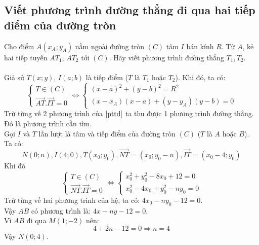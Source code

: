 \subsection{Viết phương trình đường thẳng đi qua hai tiếp điểm của đường tròn}
Cho điểm $A\left(x_A; y_A \right)$ nằm ngoài đường tròn $(C)$ tâm $I$ bán kính $R$. Từ $A$, kẻ hai tiếp tuyến $AT_1$, $AT_2$ tới $(C)$. Hãy viết phương trình đường thẳng $T_1,T_2$.\\
\\
Giả sử $T(x;y)$, $I(a;b)$ là tiếp điểm ($T$ là $T_1$ hoặc $T_2$). Khi đó, ta có:
\begin{equation} \label{pttd}
\begin{cases} T \in (C) \\ \overrightarrow{AT}.\overrightarrow{IT}=0
\end{cases} \Leftrightarrow \begin{cases} (x-a)^2+(y-b)^2=R^2\\ \left(x -x_A \right)(x-a)+\left(y -y_A \right)(y-b)=0 \end{cases}
\end{equation}
Trừ từng vế 2 phương trình của $\eqref{pttd}$ ta thu được 1 phương trình đường thẳng. Đó là phương trình cần tìm.\\
\lgi
Gọi $I$ và $T$ lần lượt là tâm và tiếp điểm của đường tròn $(C)$ ($T$ là $A$ hoặc $B$). Ta có:
$$N\left( {0;n} \right),I\left( {4;0} \right),T\left( {x_0 ;y_0 } \right),\overrightarrow {NT} = \left( {x_0 ;y_0 - n} \right),\overrightarrow {IT} = \left( {x_0 - 4;y_0 } \right) $$
Khi đó
$$\begin{cases} T \in (C) \\ \overrightarrow {NT} .\overrightarrow {IT} = 0 \end{cases} \Leftrightarrow \begin{cases} x_0^2 + y_0^2 - 8x_0 + 12 = 0 \\ x_0^2 - 4x_0 + y_0^2 - ny_0 = 0 \end{cases}$$
Trừ từng vế hai phương trình của hệ, ta có: $4x_0 - ny_0 - 12 = 0 $.\\
Vậy $AB$ có phương trình là: $4x - ny - 12 = 0$. \\
Vì $AB$ đi qua $M(1;-2)$ nên: 
$$4 + 2n -12 = 0 \Rightarrow n = 4$$
 Vậy $N(0;4)$.

